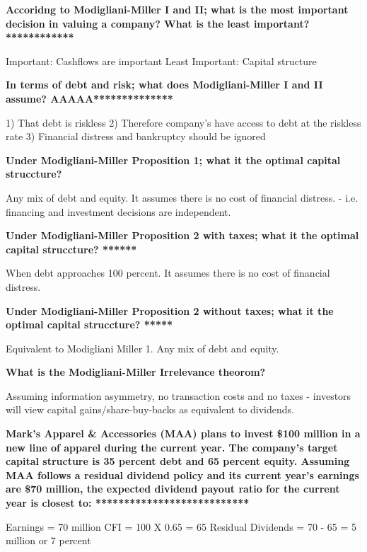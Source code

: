 \documentclass[12pt]{article}
\begin{document}
		\begin{framed}
			
		\begin{framed}
			
			\textbf{Accoridng to Modigliani-Miller I and II; what is the most important decision in valuing a company? What is the least important?************}
	
			Important: Cashflows are important
			Least Important: Capital structure
			
			\textbf{In terms of debt and risk; what does Modigliani-Miller I and II assume?  AAAAA**************}
			
			1) That debt is riskless 
			2) Therefore company's have access to debt at the riskless rate
			3) Financial distress and bankruptcy should be ignored 	
			
			\textbf{Under Modigliani-Miller Proposition 1; what it the optimal capital struccture?}
			
			Any mix of debt and equity. It assumes there is no cost of financial distress. - i.e. financing and investment decisions are independent.
							 			
			\textbf{Under Modigliani-Miller Proposition 2 with taxes; what it the optimal capital struccture? ******}		 		
			
			When debt approaches 100 percent. It assumes there is no cost of financial distress.
			
			\textbf{Under Modigliani-Miller Proposition 2 without taxes; what it the optimal capital struccture? *****}		 		
			
			Equivalent to Modigliani Miller 1. 	Any mix of debt and equity.
			
			\textbf{What is the Modigliani-Miller Irrelevance theorom?}
			
			Assuming information asymmetry, no transaction costs and no taxes - investors will view capital gains/share-buy-backs as equivalent to dividends.
			
			\textbf{Mark's Apparel & Accessories (MAA) plans to invest \$100 million in a new line of apparel during the current year. The company's target capital structure is 35 percent debt and 65 percent equity. Assuming MAA follows a residual dividend policy and its current year's earnings are \$70 million, the expected dividend payout ratio for the current year is closest to:  ***************************}
			
		 	Earnings = 70 million 
		 	CFI = 100 X 0.65 = 65
		 	Residual Dividends = 70 - 65 = 5 million or 7 percent
		 	

\end{framed}
\end{framed}
\end{document}
